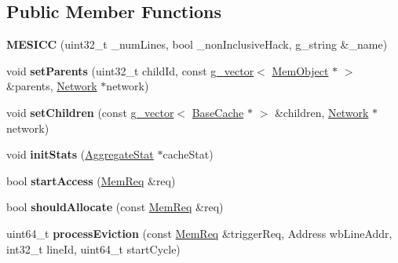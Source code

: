 \subsection*{Public Member Functions}
\begin{DoxyCompactItemize}
\item 
\hypertarget{classMESICC_a04c6c7d9cb233a108ee1232fc9fbad85}{{\bfseries M\-E\-S\-I\-C\-C} (uint32\-\_\-t \-\_\-num\-Lines, bool \-\_\-non\-Inclusive\-Hack, g\-\_\-string \&\-\_\-name)}\label{classMESICC_a04c6c7d9cb233a108ee1232fc9fbad85}

\item 
\hypertarget{classMESICC_a243383c1a22aaad6d4f82466394d5f3d}{void {\bfseries set\-Parents} (uint32\-\_\-t child\-Id, const \hyperlink{classg__vector}{g\-\_\-vector}$<$ \hyperlink{classMemObject}{Mem\-Object} $\ast$ $>$ \&parents, \hyperlink{classNetwork}{Network} $\ast$network)}\label{classMESICC_a243383c1a22aaad6d4f82466394d5f3d}

\item 
\hypertarget{classMESICC_a521b3f23da4cdeecb2bd1a6b46cde861}{void {\bfseries set\-Children} (const \hyperlink{classg__vector}{g\-\_\-vector}$<$ \hyperlink{classBaseCache}{Base\-Cache} $\ast$ $>$ \&children, \hyperlink{classNetwork}{Network} $\ast$network)}\label{classMESICC_a521b3f23da4cdeecb2bd1a6b46cde861}

\item 
\hypertarget{classMESICC_a7424c192e0d55b477e036da015e47697}{void {\bfseries init\-Stats} (\hyperlink{classAggregateStat}{Aggregate\-Stat} $\ast$cache\-Stat)}\label{classMESICC_a7424c192e0d55b477e036da015e47697}

\item 
\hypertarget{classMESICC_adb266df86e3a6455a7384bc8d3958dfc}{bool {\bfseries start\-Access} (\hyperlink{structMemReq}{Mem\-Req} \&req)}\label{classMESICC_adb266df86e3a6455a7384bc8d3958dfc}

\item 
\hypertarget{classMESICC_adff3fdd77b8eb96e12c854ce3c5496ae}{bool {\bfseries should\-Allocate} (const \hyperlink{structMemReq}{Mem\-Req} \&req)}\label{classMESICC_adff3fdd77b8eb96e12c854ce3c5496ae}

\item 
\hypertarget{classMESICC_a0489e87c75a299d40c1b06b3660b015f}{uint64\-\_\-t {\bfseries process\-Eviction} (const \hyperlink{structMemReq}{Mem\-Req} \&trigger\-Req, Address wb\-Line\-Addr, int32\-\_\-t line\-Id, uint64\-\_\-t start\-Cycle)}\label{classMESICC_a0489e87c75a299d40c1b06b3660b015f}


\end{DoxyCompactItemize}

